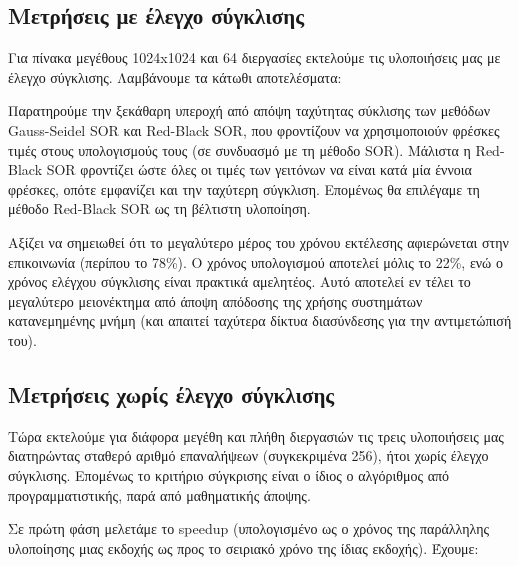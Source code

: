 \documentclass[12pt,titlepage]{article}
\begin{document}
\subsection{Μετρήσεις με έλεγχο σύγκλισης}

Για πίνακα μεγέθους 1024x1024 και 64 διεργασίες εκτελούμε τις υλοποιήσεις μας με
έλεγχο σύγκλισης. Λαμβάνουμε τα κάτωθι αποτελέσματα:

\begin{center}
\end{center}

Παρατηρούμε την ξεκάθαρη υπεροχή από απόψη ταχύτητας σύκλισης των μεθόδων
Gauss-Seidel SOR και Red-Black SOR, που φροντίζουν να χρησιμοποιούν φρέσκες
τιμές στους υπολογισμούς τους (σε συνδυασμό με τη μέθοδο SOR). Μάλιστα η
Red-Black SOR φροντίζει ώστε όλες οι τιμές των γειτόνων να είναι κατά μία
έννοια φρέσκες, οπότε εμφανίζει και την ταχύτερη σύγκλιση. Επομένως θα
επιλέγαμε τη μέθοδο Red-Black SOR ως τη βέλτιστη υλοποίηση.

Αξίζει να σημειωθεί ότι το μεγαλύτερο μέρος του χρόνου εκτέλεσης αφιερώνεται
στην επικοινωνία (περίπου το 78\%). Ο χρόνος υπολογισμού αποτελεί μόλις το 22\%,
ενώ ο χρόνος ελέγχου σύγκλισης είναι πρακτικά αμελητέος. Αυτό αποτελεί εν τέλει
το μεγαλύτερο μειονέκτημα από άποψη απόδοσης της χρήσης συστημάτων κατανεμημένης
μνήμη (και απαιτεί ταχύτερα δίκτυα διασύνδεσης για την αντιμετώπισή του).

\subsection{Μετρήσεις χωρίς έλεγχο σύγκλισης}

Τώρα εκτελούμε για διάφορα μεγέθη και πλήθη διεργασιών τις τρεις υλοποιήσεις μας
διατηρώντας σταθερό αριθμό επαναλήψεων (συγκεκριμένα 256), ήτοι χωρίς έλεγχο
σύγκλισης. Επομένως το κριτήριο σύγκρισης είναι ο ίδιος ο αλγόριθμος από
προγραμματιστικής, παρά από μαθηματικής άποψης.

Σε πρώτη φάση μελετάμε το speedup (υπολογισμένο ως ο χρόνος της παράλληλης
υλοποίησης μιας εκδοχής ως προς το σειριακό χρόνο της ίδιας εκδοχής). Έχουμε:
\end{document}
